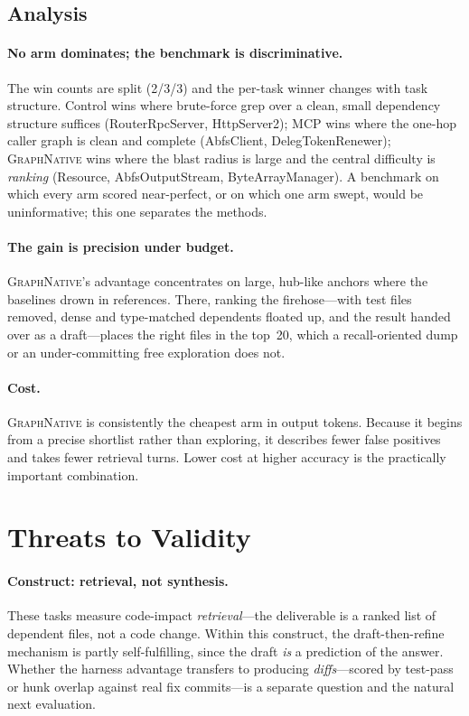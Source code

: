 \documentclass[11pt,twocolumn]{article}
\newcommand{\sys}{{\normalfont\scshape GraphNative}}
\begin{document}
\subsection{Analysis}
\paragraph{No arm dominates; the benchmark is discriminative.} The win counts are split
(2/3/3) and the per-task winner changes with task structure. Control wins where brute-force grep
over a clean, small dependency structure suffices (RouterRpcServer, HttpServer2); MCP wins where
the one-hop caller graph is clean and complete (AbfsClient, DelegTokenRenewer); \sys{} wins where
the blast radius is large and the central difficulty is \emph{ranking} (Resource,
AbfsOutputStream, ByteArrayManager). A benchmark on which every arm scored near-perfect, or on
which one arm swept, would be uninformative; this one separates the methods.

\paragraph{The gain is precision under budget.} \sys{}'s advantage concentrates on large,
hub-like anchors where the baselines drown in references. There, ranking the firehose---with test
files removed, dense and type-matched dependents floated up, and the result handed over as a
draft---places the right files in the top~20, which a recall-oriented dump or an
under-committing free exploration does not.

\paragraph{Cost.} \sys{} is consistently the cheapest arm in output tokens. Because it begins
from a precise shortlist rather than exploring, it describes fewer false positives and takes fewer
retrieval turns. Lower cost at higher accuracy is the practically important combination.

\section{Threats to Validity}
\paragraph{Construct: retrieval, not synthesis.} These tasks measure code-impact
\emph{retrieval}---the deliverable is a ranked list of dependent files, not a code change.
Within this construct, the draft-then-refine mechanism is partly self-fulfilling, since the draft
\emph{is} a prediction of the answer. Whether the harness advantage transfers to producing
\emph{diffs}---scored by test-pass or hunk overlap against real fix commits---is a separate
question and the natural next evaluation.
\end{document}
